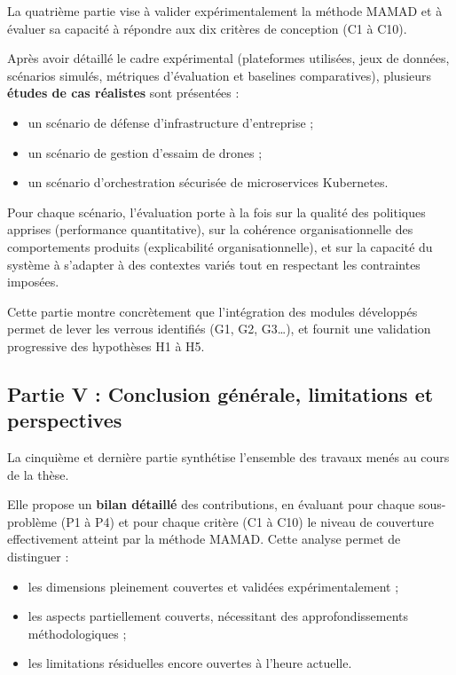 \documentclass[ twoside,openright,titlepage,numbers=noenddot,headinclude,%
                footinclude=true,cleardoublepage=empty,abstractoff, %
                BCOR=5mm,paper=a4,fontsize=11pt,%
                french,american,%
                ]{scrreprt}
\begin{document}
La quatrième partie vise à valider expérimentalement la méthode MAMAD et à évaluer sa capacité à répondre aux dix critères de conception (C1 à C10). 

Après avoir détaillé le cadre expérimental (plateformes utilisées, jeux de données, scénarios simulés, métriques d'évaluation et baselines comparatives), plusieurs \textbf{études de cas réalistes} sont présentées :

\begin{itemize}
    \item un scénario de défense d'infrastructure d'entreprise ;
    \item un scénario de gestion d'essaim de drones ;
    \item un scénario d'orchestration sécurisée de microservices Kubernetes.
\end{itemize}

Pour chaque scénario, l'évaluation porte à la fois sur la qualité des politiques apprises (performance quantitative), sur la cohérence organisationnelle des comportements produits (explicabilité organisationnelle), et sur la capacité du système à s'adapter à des contextes variés tout en respectant les contraintes imposées.

Cette partie montre concrètement que l'intégration des modules développés permet de lever les verrous identifiés (G1, G2, G3…), et fournit une validation progressive des hypothèses H1 à H5.

\subsection*{Partie V : Conclusion générale, limitations et perspectives}

La cinquième et dernière partie synthétise l'ensemble des travaux menés au cours de la thèse. 

Elle propose un \textbf{bilan détaillé} des contributions, en évaluant pour chaque sous-problème (P1 à P4) et pour chaque critère (C1 à C10) le niveau de couverture effectivement atteint par la méthode MAMAD. Cette analyse permet de distinguer :

\begin{itemize}
    \item les dimensions pleinement couvertes et validées expérimentalement ;
    \item les aspects partiellement couverts, nécessitant des approfondissements méthodologiques ;
    \item les limitations résiduelles encore ouvertes à l'heure actuelle.
\end{itemize}
\end{document}
